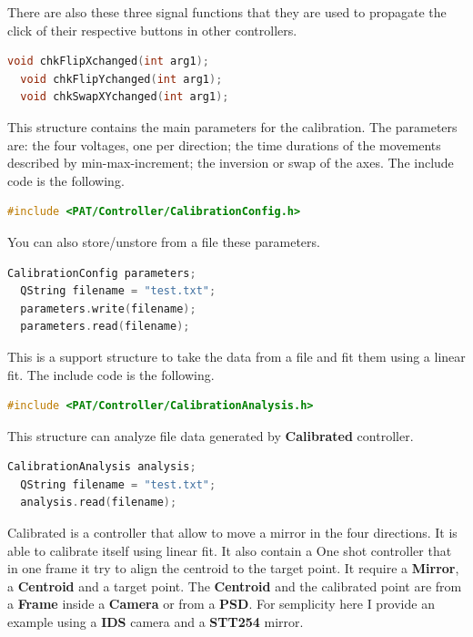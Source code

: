 There are also these three signal functions that they are used to
propagate the click of their respective buttons in other controllers.

\begin{lstlisting}[language=c++, gobble=2]
  void chkFlipXchanged(int arg1);
  void chkFlipYchanged(int arg1);
  void chkSwapXYchanged(int arg1);
\end{lstlisting}



This structure contains the main parameters for the calibration. The
parameters are: the four voltages, one per direction; the time durations
of the movements described by min-max-increment; the inversion or swap
of the axes. The include code is the following.

\begin{lstlisting}[language=c++, gobble=2]
  #include <PAT/Controller/CalibrationConfig.h>
\end{lstlisting}


You can also store/unstore from a file these parameters.

\begin{lstlisting}[language=c++, gobble=2]
  CalibrationConfig parameters;
  QString filename = "test.txt";
  parameters.write(filename);
  parameters.read(filename);
\end{lstlisting}



This is a support structure to take the data from a file and fit them
using a linear fit. The include code is the following.

\begin{lstlisting}[language=c++, gobble=2]
  #include <PAT/Controller/CalibrationAnalysis.h>
\end{lstlisting}

This structure can analyze file data generated by \textbf{Calibrated}
controller.

\begin{lstlisting}[language=c++, gobble=2]
  CalibrationAnalysis analysis;
  QString filename = "test.txt";
  analysis.read(filename);
\end{lstlisting}


Calibrated is a controller that allow to move a mirror in the four
directions. It is able to calibrate itself using linear fit. It also
contain a One shot controller that in one frame it try to align the
centroid to the target point. It require a \textbf{Mirror}, a
\textbf{Centroid} and a target point. The \textbf{Centroid} and the
calibrated point are from a \textbf{Frame} inside a \textbf{Camera} or
from a \textbf{PSD}. For semplicity here I provide an example using a
\textbf{IDS} camera and a \textbf{STT254} mirror.

